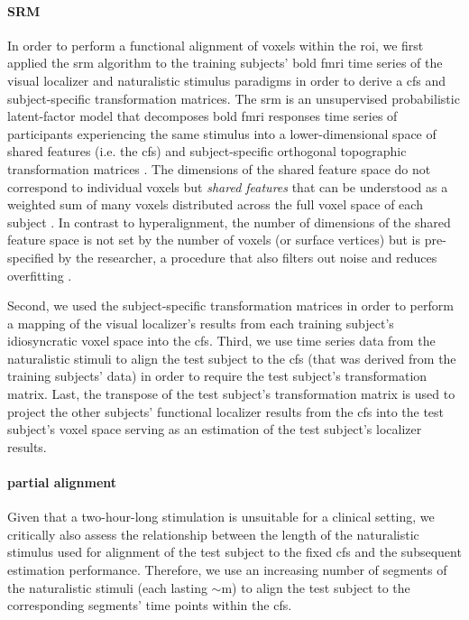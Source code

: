 \paragraph{SRM}

%
In order to perform a functional alignment of voxels within the
\ac{roi}, we first applied the \ac{srm} algorithm \citep{chen2015reduced,
richard2019fast} to the training subjects' \ac{bold} \ac{fmri} time series of
the visual localizer and naturalistic stimulus paradigms in order to derive a
\ac{cfs} and subject-specific transformation matrices.
%
The \ac{srm} is an unsupervised probabilistic latent-factor model that
decomposes \ac{bold} \ac{fmri} responses time series of participants
experiencing the same stimulus into a lower-dimensional space of shared features
(i.e. the \ac{cfs}) and subject-specific orthogonal topographic transformation
matrices \citep{kumar2020brainiak, cohen2017computational}.
%
The dimensions of the shared feature space do not correspond to individual
voxels but \textit{shared features} that can be understood as a weighted sum of
many voxels distributed across the full voxel space of each subject
\citep{kumar2020brainiak}.
%
In contrast to hyperalignment, the number of dimensions of the shared feature
space is not set by the number of voxels (or surface vertices) but is
pre-specified by the researcher, a procedure that also filters out noise and
reduces overfitting \citep{chen2015reduced}.

Second, we used the subject-specific transformation matrices in order to perform
a mapping of the visual localizer's results from each training subject's
idiosyncratic voxel space into the \ac{cfs}.
Third, we use time series data from the naturalistic stimuli to align the
test subject to the \ac{cfs} (that was derived from the training
subjects' data) in order to require the test subject's transformation matrix.
Last, the transpose of the test subject's transformation matrix is used to
project the other subjects' functional localizer results from the \ac{cfs} into
the test subject's voxel space serving as an estimation of the test subject's
localizer results.


\paragraph{partial alignment}

Given that a two-hour-long stimulation is unsuitable for a clinical setting, we
critically also assess the relationship between the length of the naturalistic
stimulus used for alignment of the test subject to the fixed \ac{cfs} and the
subsequent estimation performance.
%
Therefore, we use an increasing number of segments of the naturalistic stimuli
(each lasting $\sim$\unit[15]{m}) to align the test subject to the corresponding
segments' time points within the \ac{cfs}.


